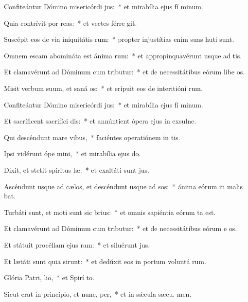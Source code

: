 \item Confiteántur Dómino misericórdi jus:~* et mirabília ejus fí minum.
\item Quia contrívit por reas:~* et vectes férre git.
\item Suscépit eos de via iniquitátis rum:~* propter injustítias enim suas huti sunt.
\item Omnem escam abomináta est ánima rum:~* et appropinquavérunt usque ad  tis.
\item Et clamavérunt ad Dóminum cum tributur:~* et de necessitátibus eórum libe os.
\item Misit verbum suum, et saná os:~* et erípuit eos de interitióni rum.
\item Confiteántur Dómino misericórdi jus:~* et mirabília ejus fí minum.
\item Et sacríficent sacrifíci dis:~* et annúntient ópera ejus in exsulne.
\item Qui descéndunt mare  vibus,~* faciéntes operatiónem in  tis.
\item Ipsi vidérunt ópe mini,~* et mirabília ejus  do.
\item Dixit, et stetit spíritus læ:~* et exaltáti sunt  jus.
\item Ascéndunt usque ad cælos, et descéndunt usque ad sos:~* ánima eórum in malis bat.
\item Turbáti sunt, et moti sunt sic brius:~* et omnis sapiéntia eórum ta est.
\item Et clamavérunt ad Dóminum cum tributur:~* et de necessitátibus eórum e os.
\item Et státuit procéllam ejus  ram:~* et siluérunt  jus.
\item Et lætáti sunt quia sirunt:~* et dedúxit eos in portum voluntá rum.
\item Glória Patri,  lio,~* et Spirí to.
\item Sicut erat in princípio, et nunc,  per,~* et in sǽcula sæcu. men.
